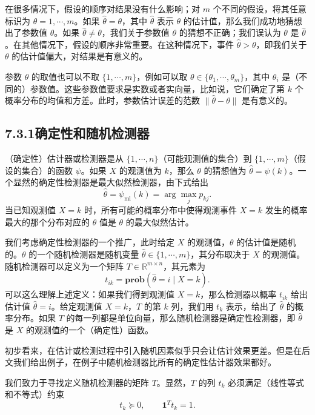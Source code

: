 \documentclass[UTF8,12pt,a4paper,fontset=fandol]{ctexart}
\begin{document}
在很多情况下，假设的顺序对结果没有什么影响；对 $m$ 个不同的假设，将其任意标识为 $\theta=1,\cdots,m$。如果 $\hat{\theta}=\theta$，其中 $\hat{\theta}$ 表示 $\theta$ 的估计值，那么我们成功地猜想出了参数值 $\theta$。如果 $\hat{\theta}\neq\theta$，我们关于参数值 $\theta$ 的猜想不正确；我们误认为 $\theta$ 是 $\hat{\theta}$。在其他情况下，假设的顺序非常重要。在这种情况下，事件 $\hat{\theta}>\theta$，即我们关于 $\theta$ 的估计值偏大，对结果是有意义的。

参数 $\theta$ 的取值也可以不取 $\{1,\cdots,m\}$，例如可以取 $\theta\in\{\theta_1,\cdots,\theta_m\}$，其中 $\theta_i$ 是（不同的）参数值。这些参数值要求是实数或者实向量，比如说，它们确定了第 $k$ 个概率分布的均值和方差。此时，参数估计误差的范数 $\|\hat{\theta}-\theta\|$ 是有意义的。

\subsection*{7.3.1\quad 确定性和随机检测器}

（确定性）估计器或检测器是从 $\{1,\cdots,n\}$（可能观测值的集合）到 $\{1,\cdots,m\}$（假设的集合）的函数 $\psi$。如果 $X$ 的观测值为 $k$，那么 $\theta$ 的猜想值为 $\hat{\theta}=\psi(k)$。一个显然的确定性检测器是最大似然检测器，由下式给出
\begin{equation}
\hat{\theta}=\psi_{\mathrm{ml}}(k)=\arg\max_j p_{kj}.
\tag{7.10}
\end{equation}
当已知观测值 $X=k$ 时，所有可能的概率分布中使得观测事件 $X=k$ 发生的概率最大的那个分布对应的 $\theta$ 值是 $\theta$ 的最大似然估计。

我们考虑确定性检测器的一个推广，此时给定 $X$ 的观测值，$\theta$ 的估计值是随机的。$\theta$ 的一个随机检测器是随机变量 $\hat{\theta}\in\{1,\cdots,m\}$，其分布取决于 $X$ 的观测值。随机检测器可以定义为一个矩阵 $T\in\mathbb{R}^{m\times n}$，其元素为
\[
t_{ik}=\mathbf{prob}(\hat{\theta}=i\mid X=k).
\]
可以这么理解上述定义：如果我们得到观测值 $X=k$，那么检测器以概率 $t_{ik}$ 给出估计值 $\hat{\theta}=i$。给定观测值 $X=k$，$T$ 的第 $k$ 列，我们用 $t_k$ 表示，给出了 $\hat{\theta}$ 的概率分布。如果 $T$ 的每一列都是单位向量，那么随机检测器是确定性检测器，即 $\hat{\theta}$ 是 $X$ 的观测值的一个（确定性）函数。

初步看来，在估计或检测过程中引入随机因素似乎只会让估计效果更差。但是在后文我们给出例子，在例子中随机检测器比所有的确定性估计器效果都好。

我们致力于寻找定义随机检测器的矩阵 $T$。显然，$T$ 的列 $t_k$ 必须满足（线性等式和不等式）约束
\begin{equation}
t_k\succeq 0,\qquad \mathbf{1}^Tt_k=1.
\tag{7.11}
\end{equation}
\end{document}
